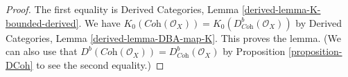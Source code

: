 \documentclass{stacks-project}
\theoremstyle{plain}
\theoremstyle{definition}
\theoremstyle{remark}
\numberwithin{equation}{subsection}
\begin{document}
\begin{proof}
The first equality is
Derived Categories, Lemma \ref{derived-lemma-K-bounded-derived}.
We have $K_0(\textit{Coh}(\mathcal{O}_X)) =
K_0(D^b_{\textit{Coh}}(\mathcal{O}_X))$ by
Derived Categories, Lemma \ref{derived-lemma-DBA-map-K}.
This proves the lemma.
(We can also use that
$D^b(\textit{Coh}(\mathcal{O}_X)) = D^b_{\textit{Coh}}(\mathcal{O}_X)$
by Proposition \ref{proposition-DCoh} to see the second
equality.)
\end{proof}
\end{document}
